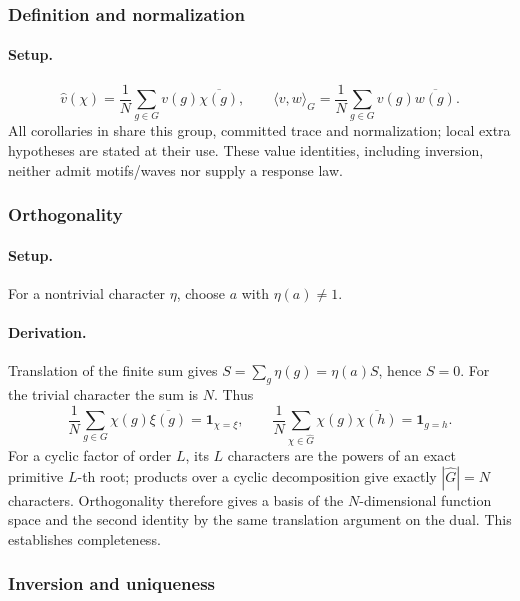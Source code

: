\subsubsection{Definition and normalization}
\paragraph{Setup.}
\begin{equation}
\widehat v(\chi)=\frac1N\sum_{g\in G}v(g)\overline{\chi(g)},
\qquad \langle v,w\rangle_G=\frac1N\sum_{g\in G}v(g)\overline{w(g)}.
\label{eq:fourier-transform}
\end{equation}
All corollaries in  share this group, committed trace and normalization;
local extra hypotheses are stated at their use. These value identities,
including inversion, neither admit motifs/waves nor supply a response law.


\subsubsection{Orthogonality}
\paragraph{Setup.}
For a nontrivial character \(\eta\), choose \(a\) with \(\eta(a)\ne1\).
\paragraph{Derivation.}
Translation of the finite sum gives \(S=\sum_g\eta(g)=\eta(a)S\), hence
\(S=0\). For the trivial character the sum is \(N\). Thus
\begin{equation}
\frac1N\sum_{g\in G}\chi(g)\overline{\xi(g)}
=\mathbf1_{\chi=\xi},\qquad
\frac1N\sum_{\chi\in\widehat G}\chi(g)\overline{\chi(h)}
=\mathbf1_{g=h}.
\label{eq:fourier-orthogonality}
\end{equation}
For a cyclic factor of order \(L\), its \(L\) characters are the powers of
an exact primitive \(L\)-th root; products over a cyclic decomposition give
exactly \(|\widehat G|=N\) characters. Orthogonality therefore gives a basis
of the \(N\)-dimensional function space and the second identity by the same
translation argument on the dual. This establishes completeness.

\subsubsection{Inversion and uniqueness}
